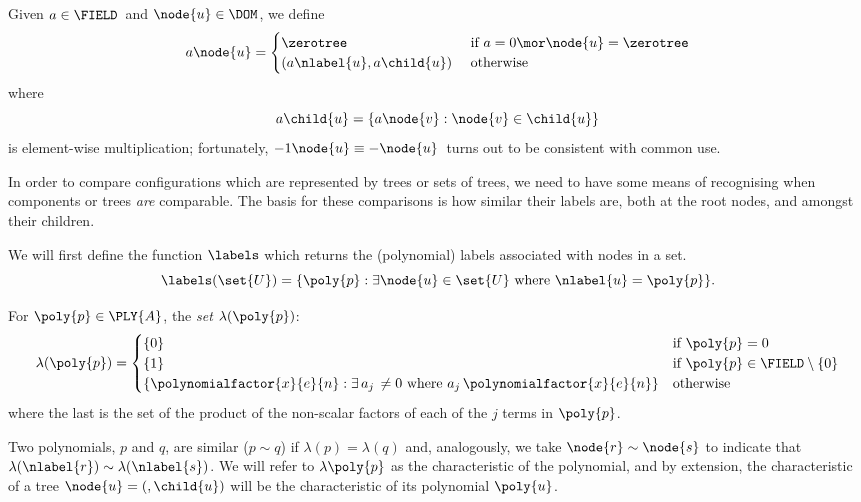 \begin{definition}\label{scalarmultiplication}
  Given $a \in \FIELD$\ and $\node{u} \in \DOM$, we
  define
  \begin{align}
    a \node{u} = \begin{cases}
      \zerotree  & \text{ if } a = 0 \mor \node{u} = \zerotree \\
      (a\nlabel{u}, a\child{u}) & \text{ otherwise }
    \end{cases}
  \end{align}
  where \[a\child{u} = \{a \node{v}: \node{v}\in\child{u}\}\] is
  element-wise multiplication; fortunately,  $-1 \node{u} \equiv
  -\node{u}$\ turns out to be consistent with common use.
\end{definition}

In order to compare configurations which are represented by trees or
sets of trees, we need to have some means of recognising when
components or trees \emph{are\/} comparable. The basis for these
comparisons is how similar their labels are, both at the root nodes,
and amongst their children.


\begin{definition}
  We will first define the function $\labels$ which returns the
  (polynomial) labels associated with nodes in a set. 
  \[
  \labels(\set{U}) = \{\poly{p}: \exists \node{u}\in\set{U}
  \text{ where }
  \nlabel{u} = \poly{p}\}.
  \]
\end{definition}


\begin{definition}\label{equivclass}
  For $\poly{p}\in\PLY{A}$, the \emph{set} $\lambda(\poly{p})$:
  \begin{equation}
    \lambda(\poly{p}) = \begin{cases}
      \{0\} & \text{if } \poly{p} = 0 \\
      \{1\} & \text{if }\poly{p}\in\FIELD\setminus\{0\} \\
      \{\polynomialfactor{x}{e}{n}: \exists\, a_j\, \neq 0
      \text{ where $a_j\,\polynomialfactor{x}{e}{n}$}\}
        &\text{otherwise} \\
    \end{cases}
  \end{equation}
  where the last is the set of the product of the non-scalar factors
  of each of the $j$ terms in $\poly{p}$.
\end{definition}

Two polynomials, $p$ and $q$, are similar ($p \sim q$) if $\lambda(p)
= \lambda(q)$ and, analogously, we take $\node{r}\sim\node{s}$ to
indicate that $\lambda(\nlabel{r}) \sim \lambda(\nlabel{s})$. We will
refer to $\lambda{\poly{p}}$ as the characteristic of the polynomial,
and by extension, the characteristic of a tree $\node{u} = (\label{u},
\child{u})$ will be the characteristic of its polynomial $\poly{u}$.

